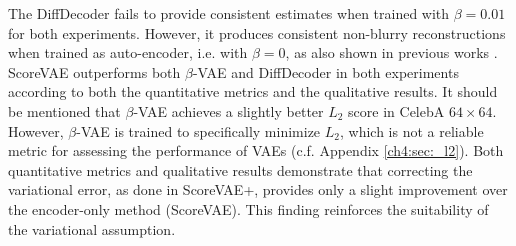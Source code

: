 The DiffDecoder fails to provide consistent estimates when trained with $\beta=0.01$ for both experiments. However, it produces consistent non-blurry reconstructions when trained as auto-encoder, i.e. with $\beta=0$, as also shown in previous works \cite{preechakul2022diffusion_decoder, yang2023ldiffusion_decoder_compression}. ScoreVAE outperforms both $\beta$-VAE and DiffDecoder in both experiments according to both the quantitative metrics and the qualitative results. It should be mentioned that $\beta$-VAE achieves a slightly better $L_2$ score in CelebA $64\times 64$. However, 
$\beta$-VAE is trained to specifically minimize $L_2$, which is not a reliable metric for assessing the performance of VAEs (c.f. Appendix \ref{ch4:sec:_l2}). Both quantitative metrics and qualitative results demonstrate that correcting the variational error, as done in ScoreVAE+, provides only a slight improvement over the encoder-only method (ScoreVAE). This finding reinforces the suitability of the variational assumption.



